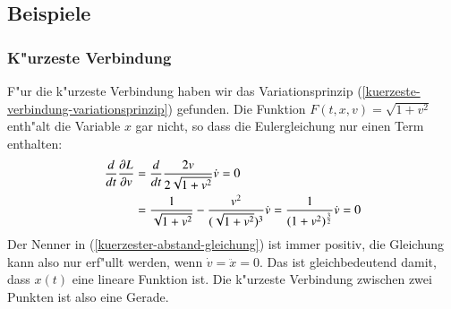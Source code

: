 \subsection{Beispiele}
\subsubsection{K"urzeste Verbindung}
F"ur die k"urzeste Verbindung haben wir das Variationsprinzip
(\ref{kuerzeste-verbindung-variationsprinzip}) gefunden.
Die Funktion $F(t,x,v)=\sqrt{1+v^2}$ enth"alt die Variable
$x$ gar nicht, so dass die Eulergleichung nur einen Term
enthalten:
\begin{align}
\frac{d}{dt}\frac{\partial L}{\partial v}
&=\frac{d}{dt}\frac{2v}{2\sqrt{1+v^2}}\dot v =0
\notag
\\
&=\frac1{\sqrt{1+v^2}} - \frac{v^2}{(\sqrt{1+v^2})^3}\dot v
=\frac1{(1+v^2)^{\frac32}}\dot v=0
\label{kuerzester-abstand-gleichung}
\end{align}
Der Nenner in (\ref{kuerzester-abstand-gleichung}) ist immer
positiv, die Gleichung kann also nur erf"ullt werden, wenn
$\dot v =\ddot x=0$. Das ist gleichbedeutend damit, dass 
$x(t)$ eine lineare Funktion ist.
Die k"urzeste Verbindung zwischen zwei Punkten ist also eine
Gerade.

